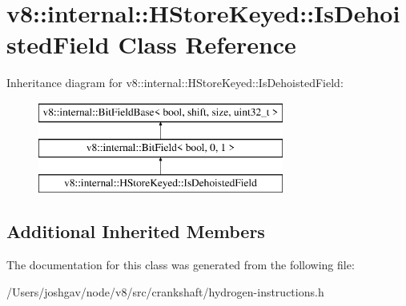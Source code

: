 \hypertarget{classv8_1_1internal_1_1_h_store_keyed_1_1_is_dehoisted_field}{}\section{v8\+:\+:internal\+:\+:H\+Store\+Keyed\+:\+:Is\+Dehoisted\+Field Class Reference}
\label{classv8_1_1internal_1_1_h_store_keyed_1_1_is_dehoisted_field}
Inheritance diagram for v8\+:\+:internal\+:\+:H\+Store\+Keyed\+:\+:Is\+Dehoisted\+Field\+:\begin{figure}[H]
\begin{center}
\leavevmode
\includegraphics[height=3.000000cm]{classv8_1_1internal_1_1_h_store_keyed_1_1_is_dehoisted_field}
\end{center}
\end{figure}
\subsection*{Additional Inherited Members}


The documentation for this class was generated from the following file\+:\begin{DoxyCompactItemize}
\item 
/\+Users/joshgav/node/v8/src/crankshaft/hydrogen-\/instructions.\+h\end{DoxyCompactItemize}
